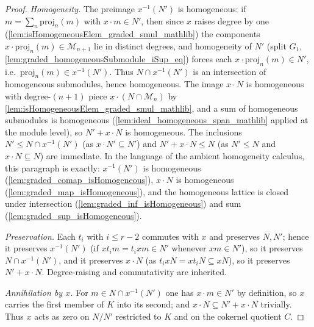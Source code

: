 \begin{proof}
    \leanok
  \emph{Homogeneity.} The preimage \(x^{-1}(N')\) is homogeneous: if
  \(m = \sum_n \mathrm{proj}_n(m)\) with \(x \cdot m \in N'\), then since \(x\) raises
  degree by one (\cref{lem:isHomogeneousElem_graded_smul_mathlib}) the components
  \(x \cdot \mathrm{proj}_n(m) \in \mathcal{M}_{n+1}\) lie in distinct degrees, and
  homogeneity of \(N'\) (split \(G_1\),
  \cref{lem:graded_homogeneousSubmodule_iSup_eq}) forces each
  \(x \cdot \mathrm{proj}_n(m) \in N'\), i.e.\ \(\mathrm{proj}_n(m) \in x^{-1}(N')\).
  Thus \(N \cap x^{-1}(N')\) is an intersection of homogeneous submodules, hence
  homogeneous. The image \(x \cdot N\) is homogeneous with degree-\((n+1)\) piece
  \(x \cdot (N \cap \mathcal{M}_n)\) by
  \cref{lem:isHomogeneousElem_graded_smul_mathlib}, and a sum of homogeneous
  submodules is homogeneous (\cref{lem:ideal_homogeneous_span_mathlib} applied at the
  module level), so \(N' + x \cdot N\) is homogeneous. The inclusions
  \(N' \le N \cap x^{-1}(N')\) (as \(x \cdot N' \subseteq N'\)) and
  \(N' + x \cdot N \le N\) (as \(N' \le N\) and \(x \cdot N \subseteq N\)) are
  immediate. In the language of the ambient homogeneity calculus, this paragraph is
  exactly: \(x^{-1}(N')\) is homogeneous (\cref{lem:graded_comap_isHomogeneous}),
  \(x \cdot N\) is homogeneous (\cref{lem:graded_map_isHomogeneous}), and the
  homogeneous lattice is closed under intersection
  (\cref{lem:graded_inf_isHomogeneous}) and sum
  (\cref{lem:graded_sup_isHomogeneous}).

  \emph{Preservation.} Each \(t_i\) with \(i \le r-2\) commutes with \(x\) and
  preserves \(N, N'\); hence it preserves \(x^{-1}(N')\) (if \(x t_i m = t_i x m \in
  N'\) whenever \(x m \in N'\)), so it preserves \(N \cap x^{-1}(N')\), and it
  preserves \(x \cdot N\) (as \(t_i x N = x t_i N \subseteq x N\)), so it preserves
  \(N' + x \cdot N\). Degree-raising and commutativity are inherited.

  \emph{Annihilation by \(x\).} For \(m \in N \cap x^{-1}(N')\) one has
  \(x \cdot m \in N'\) by definition, so \(x\) carries the first member of \(K\) into
  its second; and \(x \cdot N \subseteq N' + x \cdot N\) trivially. Thus \(x\) acts as
  zero on \(N/N'\) restricted to \(K\) and on the cokernel quotient \(C\).


\end{proof}
